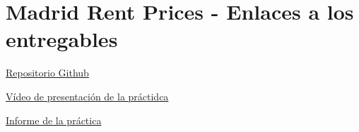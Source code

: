 \documentclass[12pt,a4paper]{article}
\begin{document}




\section*{Madrid Rent Prices - Enlaces a los entregables}

\href{https://github.com/jvruoc/rent_prices}{Repositorio Github}

\href{https://drive.google.com/file/d/1SARoZxhUi1I9YunV7tMjldsZNDo4Sdiz/view?usp=sharing}{Vídeo de presentación de la práctidca}

\href{https://github.com/jvruoc/rent_prices/blob/master/pdf/PRA1.pdf}{Informe de la práctica}
\end{document}
